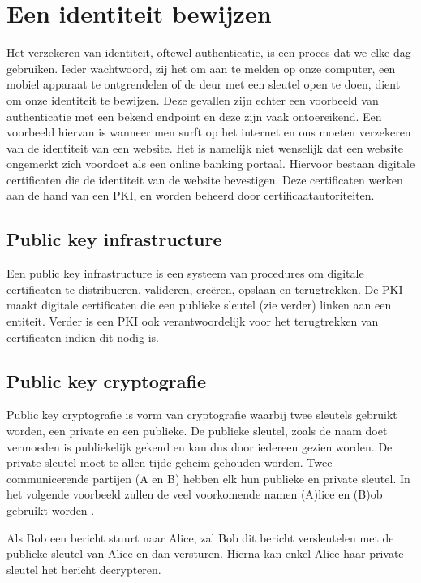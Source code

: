 \chapter{Een identiteit bewijzen}
\label{ch:identiteit-bewijzen}

Het verzekeren van identiteit, oftewel authenticatie, is een proces dat we elke
dag gebruiken. Ieder wachtwoord, zij het om aan te melden op onze computer,
een mobiel apparaat te ontgrendelen of de deur met een sleutel open te doen,
dient om onze identiteit te bewijzen. Deze gevallen zijn echter
een voorbeeld van authenticatie met een bekend endpoint en deze zijn vaak
ontoereikend. Een voorbeeld hiervan is wanneer men surft op het internet en ons
moeten verzekeren van de identiteit van een website. Het is namelijk niet
wenselijk dat
een website ongemerkt zich voordoet als een online banking portaal. Hiervoor
bestaan digitale certificaten die de identiteit van de website bevestigen. Deze
certificaten werken aan de hand van een \gls{PKI},
en worden beheerd door certificaatautoriteiten.

\section{Public key infrastructure}
\label{sec:public-key-infrastructure}

Een public key infrastructure is een systeem van procedures om digitale
certificaten te distribueren, valideren, creëren, opslaan en terugtrekken. De
\gls{PKI} maakt digitale certificaten die een publieke sleutel (zie verder)
linken aan een
entiteit. Verder is een \gls{PKI} ook verantwoordelijk voor het terugtrekken van
certificaten indien dit nodig is.

\section{Public key cryptografie}
\label{sec:public-key-cryptografie}

Public key cryptografie is vorm van cryptografie waarbij twee sleutels gebruikt
worden, een private en een publieke. De publieke sleutel, zoals de naam doet
vermoeden is publiekelijk gekend en kan dus door iedereen gezien worden. De
private sleutel moet te allen tijde geheim gehouden worden. Twee communicerende
partijen (A en B) hebben elk hun publieke en private sleutel. In het volgende
voorbeeld zullen de veel voorkomende namen (A)lice en (B)ob gebruikt worden
\autocite{Rivest1978}.

Als Bob een bericht stuurt naar Alice, zal Bob dit bericht versleutelen met de
publieke sleutel van Alice en dan versturen. Hierna kan enkel Alice haar private
sleutel het bericht decrypteren.

